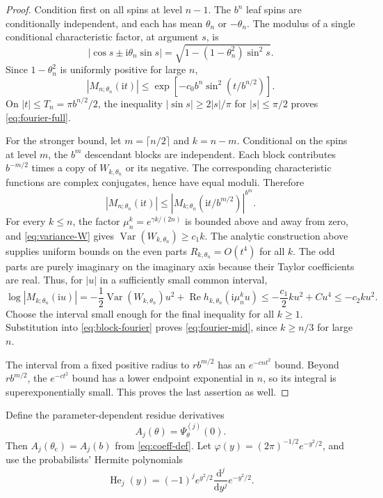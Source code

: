 \documentclass[11pt]{article}
\theoremstyle{definition}
\newcommand{\Var}{\operatorname{Var}}
\newcommand{\He}{\operatorname{He}}
\newcommand{\ii}{\mathrm i}
\newcommand{\crit}{\theta_{\mathrm c}}
\begin{document}
\begin{proof}
Condition first on all spins at level $n-1$. The $b^n$ leaf spins are
conditionally independent, and each has mean $\theta_n$ or
$-\theta_n$. The modulus of a single conditional characteristic
factor, at argument $s$, is
\[
       |\cos s\pm\ii\theta_n\sin s|
           =\sqrt{1-(1-\theta_n^2)\sin^2s}.
\]
Since $1-\theta_n^2$ is uniformly positive for large $n$,
\[
 |M_{n;\theta_n}(\ii t)|
 \leq\exp\!\left[-c_0b^n\sin^2(t/b^{n/2})\right].
\]
On $|t|\leq T_n=\pi b^{n/2}/2$, the inequality
$|\sin s|\geq2|s|/\pi$ for $|s|\leq\pi/2$ proves
\eqref{eq:fourier-full}.

For the stronger bound, let $m=\lceil n/2\rceil$ and $k=n-m$.
Conditional on the spins at level $m$, the $b^m$ descendant blocks
are independent. Each block contributes $b^{-m/2}$ times a copy of
$W_{k,\theta_n}$ or its negative. The corresponding characteristic
functions are complex conjugates, hence have equal moduli. Therefore
\begin{equation}\label{eq:block-fourier}
 |M_{n;\theta_n}(\ii t)|
      \leq\left|M_{k;\theta_n}(\ii t/b^{m/2})\right|^{b^m}.
\end{equation}
For every $k\leq n$, the factor
$\mu_n^k=e^{\gamma k/(2n)}$ is bounded above and away from zero,
and \eqref{eq:variance-W} gives
$\Var(W_{k,\theta_n})\geq c_1k$.
The analytic construction above supplies uniform bounds on the even
parts $R_{k,\theta_n}=O(t^4)$ for all $k$. The odd parts are purely
imaginary on the imaginary axis because their Taylor coefficients are
real. Thus, for $|u|$ in a sufficiently small common interval,
\[
 \log|M_{k;\theta_n}(\ii u)|
    =-\frac12\Var(W_{k,\theta_n})u^2
        +\operatorname{Re}h_{k,\theta_n}(\ii\mu_n^ku)
    \leq-\frac{c_1}2ku^2+C u^4
    \leq-c_2ku^2.
\]
Choose the interval small enough for the final inequality for all
$k\geq1$. Substitution into \eqref{eq:block-fourier} proves
\eqref{eq:fourier-mid}, since $k\geq n/3$ for large $n$.

The interval from a fixed positive radius to $r b^{m/2}$ has an
$e^{-cn t^2}$ bound. Beyond $r b^{m/2}$, the $e^{-ct^2}$ bound has
a lower endpoint exponential in $n$, so its integral is
superexponentially small. This proves the last assertion as well.
\end{proof}

Define the parameter-dependent residue derivatives
\begin{equation}\label{eq:parameter-A}
 A_j(\theta)=\Psi_\theta^{(j)}(0).
\end{equation}
Then $A_j(\crit)=A_j(b)$ from \eqref{eq:coeff-def}. Let
$\varphi(y)=(2\pi)^{-1/2}e^{-y^2/2}$, and use the probabilists'
Hermite polynomials
\[
 \He_j(y)=(-1)^je^{y^2/2}\frac{\mathrm d^j}{\mathrm dy^j}e^{-y^2/2}.
\]
\end{document}
